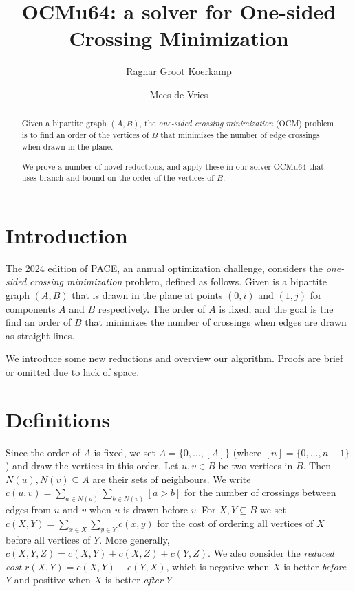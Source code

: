 \documentclass[a4paper,UKenglish,cleveref, autoref, thm-restate]{lipics-v2021}
\title{OCMu64: a solver for One-sided Crossing Minimization} %
\author{Ragnar {Groot Koerkamp}}{ETH Zurich, Switzerland}{ragnar.grootkoerkamp@gmail.com}{https://orcid.org/0000-0002-2091-1237}{}%
\author{Mees de Vries}{}{}{}{}
\begin{document}
\maketitle

\begin{abstract}
  Given a bipartite graph $(A,B)$, the \emph{one-sided crossing minimization} (OCM) problem is to find an order of the
  vertices of $B$ that minimizes the number
  of edge crossings when drawn in the plane.

  We prove a number of novel reductions, and apply these in our solver OCMu64 that
  uses branch-and-bound on the order of the vertices of $B$.
\end{abstract}

\section{Introduction}

The 2024 edition of PACE, an annual optimization challenge, considers the
\emph{one-sided crossing minimization} problem, defined as follows.
Given is a bipartite graph $(A, B)$ that is drawn in the plane at points
$(0, i)$ and $(1,j)$ for components $A$ and $B$ respectively. The order of $A$
is fixed, and the goal is the find an order of $B$ that minimizes the number of
crossings when edges are drawn as straight lines.

We introduce some new reductions and overview our algorithm. Proofs are brief or
omitted due to lack of space.

\section{Definitions}
Since the order of $A$ is fixed, we set $A=\{0, \dots, [A]\}$ (where $[n]=\{0,\dots,n-1\}$) and draw the
vertices in this order.
Let $u, v\in B$ be two vertices in $B$. Then $N(u),N(v)\subseteq A$ are their sets of
neighbours.
We write $c(u,v)=\sum_{a\in N(u)}\sum_{b\in N(v)} [a>b]$ for the number of crossings between edges from $u$ and $v$
when $u$ is drawn before $v$. For $X,Y\subseteq B$ we set
$c(X,Y) = \sum_{x\in X}\sum_{y\in Y} c(x,y)$ for the cost of ordering all
vertices of $X$ before all vertices of $Y$.
More generally, $c(X,Y,Z) = c(X, Y) + c(X, Z) + c(Y, Z)$.
We also consider the \emph{reduced cost} $r(X,Y) = c(X, Y) - c(Y, X)$, which is
negative when $X$ is better \emph{before} $Y$ and positive when $X$ is better \emph{after} $Y$.
\end{document}

